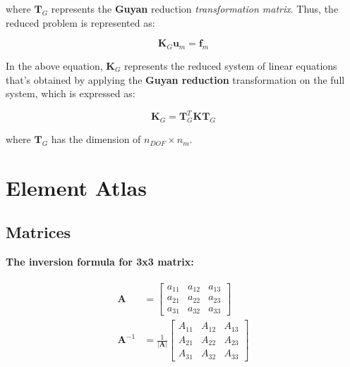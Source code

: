 \documentclass[10pt,b5paper,titlepage]{book}
\newenvironment{eqarray}
{
    \begin{eqnarray}
        \begin{aligned}
}
{
        \end{aligned}
    \end{eqnarray}
}
\begin{document}
where $ \mathbf{T}_G $ represents the \textbf{Guyan} reduction \textit{transformation matrix}.
Thus, the reduced problem is represented as:

\begin{equation}
    \mathbf{K}_G \mathbf{u}_m = \mathbf{f}_m
\end{equation}

In the above equation, $ \mathbf{K}_G $ represents the reduced system of linear equations
that's obtained by applying the \textbf{Guyan reduction} transformation on the
full system, which is expressed as:

\begin{equation}
    \mathbf{K}_G = \mathbf{T}_G^T \mathbf{K} \mathbf{T}_G
\end{equation}

where $ \mathbf{T}_G $ has the dimension of $ n_{DOF} \times n_m $.




\newpage
\chapter{Element Atlas}

\section{Matrices}

\textbf{The inversion formula for 3x3 matrix:}

\begin{eqarray}
    \mathbf{A} &=
    \begin{bmatrix}
        a_{11} & a_{12} & a_{13}\\
        a_{21} & a_{22} & a_{23}\\
        a_{31} & a_{32} & a_{33}
    \end{bmatrix}\\
    \mathbf{A}^{-1} &= \frac{1}{\vert \mathbf{A} \vert}
    \begin{bmatrix}
        A_{11} & A_{12} & A_{13}\\
        A_{21} & A_{22} & A_{23}\\
        A_{31} & A_{32} & A_{33}
    \end{bmatrix}\\
\end{eqarray}
\end{document}
